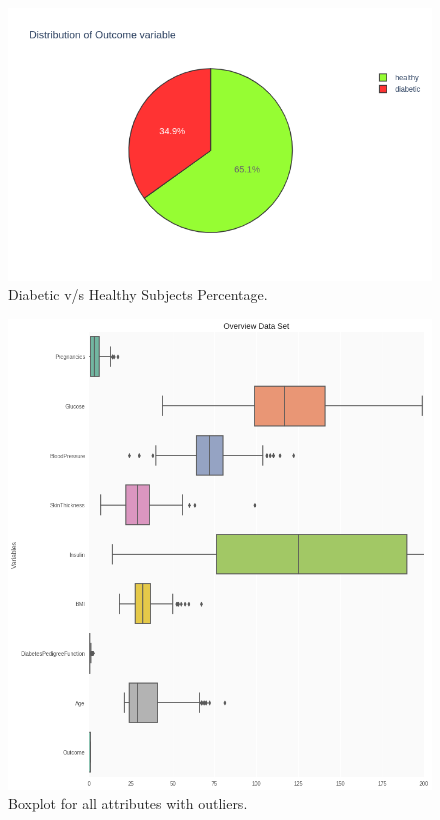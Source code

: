 \documentclass[12pt]{article}
\begin{document}
\begin{figure}[ht]
\centering
\includegraphics[width=1\textwidth]{2.png}
\caption{\label{fig:9} Diabetic v/s Healthy Subjects Percentage.}
\end{figure}

\begin{figure}[ht]
\centering
\includegraphics[width=1\textwidth]{3.png}
\caption{\label{fig:10} Boxplot for all attributes with outliers.}
\end{figure}
\end{document}
